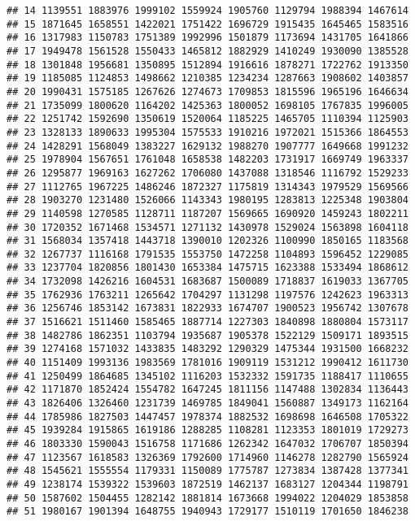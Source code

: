 \documentclass[
]{article}
\begin{document}
\begin{verbatim}
## 14 1139551 1883976 1999102 1559924 1905760 1129794 1988394 1467614
## 15 1871645 1658551 1422021 1751422 1696729 1915435 1645465 1583516
## 16 1317983 1150783 1751389 1992996 1501879 1173694 1431705 1641866
## 17 1949478 1561528 1550433 1465812 1882929 1410249 1930090 1385528
## 18 1301848 1956681 1350895 1512894 1916616 1878271 1722762 1913350
## 19 1185085 1124853 1498662 1210385 1234234 1287663 1908602 1403857
## 20 1990431 1575185 1267626 1274673 1709853 1815596 1965196 1646634
## 21 1735099 1800620 1164202 1425363 1800052 1698105 1767835 1996005
## 22 1251742 1592690 1350619 1520064 1185225 1465705 1110394 1125903
## 23 1328133 1890633 1995304 1575533 1910216 1972021 1515366 1864553
## 24 1428291 1568049 1383227 1629132 1988270 1907777 1649668 1991232
## 25 1978904 1567651 1761048 1658538 1482203 1731917 1669749 1963337
## 26 1295877 1969163 1627262 1706080 1437088 1318546 1116792 1529233
## 27 1112765 1967225 1486246 1872327 1175819 1314343 1979529 1569566
## 28 1903270 1231480 1526066 1143343 1980195 1283813 1225348 1903804
## 29 1140598 1270585 1128711 1187207 1569665 1690920 1459243 1802211
## 30 1720352 1671468 1534571 1271132 1430978 1529024 1563898 1604118
## 31 1568034 1357418 1443718 1390010 1202326 1100990 1850165 1183568
## 32 1267737 1116168 1791535 1553750 1472258 1104893 1596452 1229085
## 33 1237704 1820856 1801430 1653384 1475715 1623388 1533494 1868612
## 34 1732098 1426216 1604531 1683687 1500089 1718837 1619033 1367705
## 35 1762936 1763211 1265642 1704297 1131298 1197576 1242623 1963313
## 36 1256746 1853142 1673831 1822933 1674707 1900523 1956742 1307678
## 37 1516621 1511460 1585465 1887714 1227303 1840898 1880804 1573117
## 38 1482786 1862351 1103794 1935687 1905378 1522129 1509171 1893515
## 39 1274168 1571032 1433835 1483292 1290329 1475344 1931500 1668232
## 40 1151409 1993136 1983569 1781016 1909119 1531212 1990412 1611730
## 41 1250499 1864685 1345102 1116203 1532332 1591735 1188417 1110655
## 42 1171870 1852424 1554782 1647245 1811156 1147488 1302834 1136443
## 43 1826406 1326460 1231739 1469785 1849041 1560887 1349173 1162164
## 44 1785986 1827503 1447457 1978374 1882532 1698698 1646508 1705322
## 45 1939284 1915865 1619186 1288285 1108281 1123353 1801019 1729273
## 46 1803330 1590043 1516758 1171686 1262342 1647032 1706707 1850394
## 47 1123567 1618583 1326369 1792600 1714960 1146278 1282790 1565924
## 48 1545621 1555554 1179331 1150089 1775787 1273834 1387428 1377341
## 49 1238174 1539322 1539603 1872519 1462137 1683127 1204344 1198791
## 50 1587602 1504455 1282142 1881814 1673668 1994022 1204029 1853858
## 51 1980167 1901394 1648755 1940943 1729177 1510119 1701650 1846238
\end{verbatim}
\end{document}
